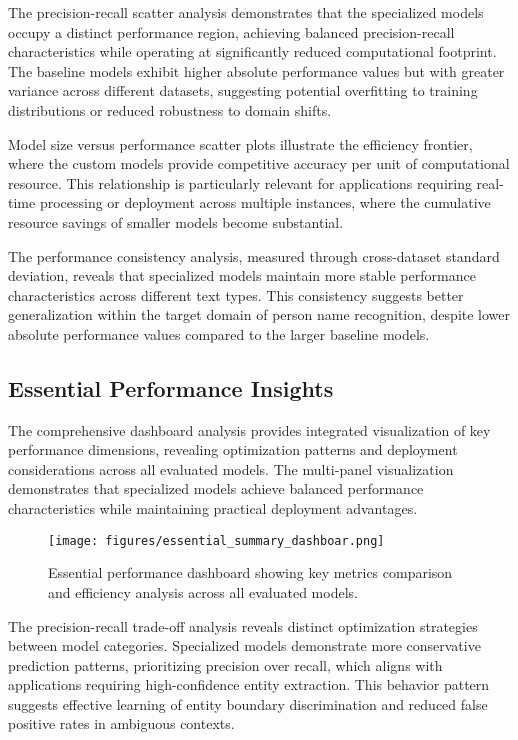 \documentclass[a4paper]{usiinfbachelorproject}
\begin{document}
The precision-recall scatter analysis demonstrates that the specialized models occupy a distinct performance region, achieving balanced precision-recall characteristics while operating at significantly reduced computational footprint. The baseline models exhibit higher absolute performance values but with greater variance across different datasets, suggesting potential overfitting to training distributions or reduced robustness to domain shifts.

Model size versus performance scatter plots illustrate the efficiency frontier, where the custom models provide competitive accuracy per unit of computational resource. This relationship is particularly relevant for applications requiring real-time processing or deployment across multiple instances, where the cumulative resource savings of smaller models become substantial.

The performance consistency analysis, measured through cross-dataset standard deviation, reveals that specialized models maintain more stable performance characteristics across different text types. This consistency suggests better generalization within the target domain of person name recognition, despite lower absolute performance values compared to the larger baseline models.

\subsection{Essential Performance Insights}

The comprehensive dashboard analysis provides integrated visualization of key performance dimensions, revealing optimization patterns and deployment considerations across all evaluated models. The multi-panel visualization demonstrates that specialized models achieve balanced performance characteristics while maintaining practical deployment advantages.

\begin{figure}[H]
    \centering
    \texttt{[image: figures/essential\_summary\_dashboar.png]}
    \caption{Essential performance dashboard showing key metrics comparison and efficiency analysis across all evaluated models.}
    \label{fig:essential_insights}
\end{figure}

The precision-recall trade-off analysis reveals distinct optimization strategies between model categories. Specialized models demonstrate more conservative prediction patterns, prioritizing precision over recall, which aligns with applications requiring high-confidence entity extraction. This behavior pattern suggests effective learning of entity boundary discrimination and reduced false positive rates in ambiguous contexts.
\end{document}
